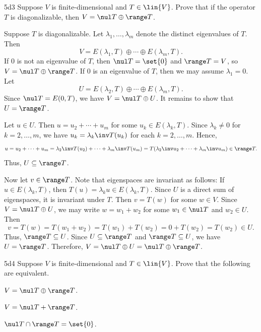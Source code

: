 \begin{exercise}{5d3}
    Suppose $V$ is finite-dimensional and $T \in \lin{V}$.
    Prove that if the operator $T$ is diagonalizable, then $V = \nul T \oplus \range T$.
\end{exercise}

\begin{sol}
    Suppose $T$ is diagonalizable.
    Let $\lambda_1, \ldots, \lambda_m$ denote the distinct eigenvalues of $T$.
    Then
    \[
        V = E(\lambda_1, T) \oplus \cdots \oplus E(\lambda_m, T).
    \]
    If 0 is not an eigenvalue of $T$, then $\nul T = \set{0}$ and $\range T = V$, so $V = \nul T \oplus \range T$.
    If 0 is an eigenvalue of $T$, then we may assume $\lambda_1 = 0$.
    Let
    \[
        U = E(\lambda_2, T) \oplus \cdots \oplus E(\lambda_m, T).
    \]
    Since $\nul T = E(0, T)$, we have $V = \nul T \oplus U$.
    It remains to show that $U = \range T$.

    Let $u \in U$.
    Then $u = u_2 + \cdots + u_m$ for some $u_k \in E(\lambda_k, T)$.
    Since $\lambda_k \neq 0$ for $k = 2, \ldots, m$, we have $u_k = \lambda_k\inv T(u_k)$ for each $k = 2, \ldots, m$.
    Hence,
    \[
        u = u_2 + \cdots + u_m = \lambda_2\inv T(u_2) + \cdots + \lambda_m\inv T(u_m) = T(\lambda_2\inv u_2 + \cdots + \lambda_m\inv u_m) \in \range T.
    \]
    Thus, $U \subseteq \range T$.

    Now let $v \in \range T$.
    Note that eigenspaces are invariant as follows: If $u \in E(\lambda_k, T)$, then $T(u) = \lambda_k u \in E(\lambda_k, T)$.
    Since $U$ is a direct sum of eigenspaces, it is invariant under $T$.
    Then $v = T(w)$ for some $w \in V$.
    Since $V = \nul T \oplus U$, we may write $w = w_1 + w_2$ for some $w_1 \in \nul T$ and $w_2 \in U$.
    Then
    \[
        v = T(w) = T(w_1 + w_2) = T(w_1) + T(w_2) = 0 + T(w_2) = T(w_2) \in U.
    \]
    Thus, $\range T \subseteq U$.
    Since $U \subseteq \range T$ and $\range T \subseteq U$, we have $U = \range T$.
    Therefore, $V = \nul T \oplus U = \nul T \oplus \range T$.
\end{sol}

\begin{exercise}{5d4}
    Suppose $V$ is finite-dimensional and $T \in \lin{V}$.
    Prove that the following are equivalent.
    \begin{subexercises}
        \item $V = \nul T \oplus \range T$.
        \item $V = \nul T + \range T$.
        \item $\nul T \cap \range T = \set{0}$.
    \end{subexercises}
\end{exercise}

